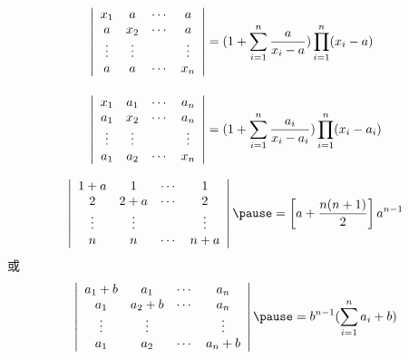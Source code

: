 \begin{frame}
  $$
  \begin{array}{l}
      \left|
    \begin{array}{cccc}
      x_1 &  a  & \cd & a   \\
      a   & x_2 & \cd & a   \\
      \vd & \vd &     & \vd \\
      a   &  a  & \cd & x_n
    \end{array}
    \right| = \disp  (1+\sum_{i=1}^n \frac{a}{x_i-a})\prod_{i=1}^n(x_i-a)
    \\[0.5in]
    \left|
    \begin{array}{cccc}
      x_1 & a_1  & \cd & a_n   \\
      a_1 & x_2 & \cd  & a_n   \\
      \vd & \vd &     & \vd \\
      a_1 & a_2  & \cd & x_n
    \end{array}
    \right| = \disp (1+\sum_{i=1}^n \frac{a_i}{x_i-a_i})\prod_{i=1}^n(x_i-a_i)
  
  \end{array}
  $$      
\end{frame}

\begin{frame}
  \begin{center}
  \end{center}
    
    $$
    \left|
    \begin{array}{cccc}
      1+a &  1  & \cd & 1   \\
      2   & 2+a & \cd & 2  \\
      \vd & \vd &     & \vd \\
      n   &  n  & \cd & n+a
    \end{array}
    \right| \pause = \left[a+ \frac{n(n+1)}2\right]a^{n-1}
    $$
    或
    $$
    \left|
    \begin{array}{cccc}
      a_1+b & a_1   & \cd & a_n   \\
      a_1   & a_2+b & \cd  & a_n   \\
      \vd   & \vd  &     & \vd \\
      a_1   & a_2   & \cd & a_n+b
    \end{array}
    \right| \pause = b^{n-1}(\sum_{i=1}^na_i+b)
    $$      
\end{frame}






